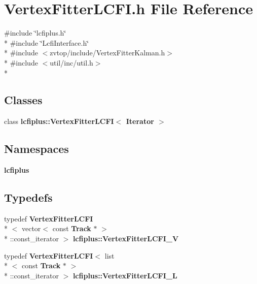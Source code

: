 \section{Vertex\-Fitter\-L\-C\-F\-I.\-h File Reference}
\label{VertexFitterLCFI_8h}
{\ttfamily \#include \char`\"{}lcfiplus.\-h\char`\"{}}\\*
{\ttfamily \#include \char`\"{}Lcfi\-Interface.\-h\char`\"{}}\\*
{\ttfamily \#include $<$zvtop/include/\-Vertex\-Fitter\-Kalman.\-h$>$}\\*
{\ttfamily \#include $<$util/inc/util.\-h$>$}\\*
\subsection*{Classes}
\begin{DoxyCompactItemize}
\item 
class {\bf lcfiplus\-::\-Vertex\-Fitter\-L\-C\-F\-I$<$ Iterator $>$}
\end{DoxyCompactItemize}
\subsection*{Namespaces}
\begin{DoxyCompactItemize}
\item 
{\bf lcfiplus}
\end{DoxyCompactItemize}
\subsection*{Typedefs}
\begin{DoxyCompactItemize}
\item 
typedef {\bf Vertex\-Fitter\-L\-C\-F\-I}\\*
$<$ vector$<$ const {\bf Track} $\ast$ $>$\\*
\-::const\-\_\-iterator $>$ {\bf lcfiplus\-::\-Vertex\-Fitter\-L\-C\-F\-I\-\_\-\-V}
\item 
typedef {\bf Vertex\-Fitter\-L\-C\-F\-I}$<$ list\\*
$<$ const {\bf Track} $\ast$ $>$\\*
\-::const\-\_\-iterator $>$ {\bf lcfiplus\-::\-Vertex\-Fitter\-L\-C\-F\-I\-\_\-\-L}
\end{DoxyCompactItemize}
